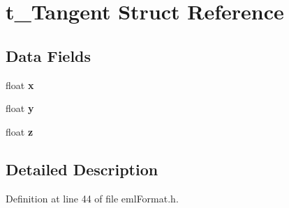 \hypertarget{structt___tangent}{}\section{t\+\_\+\+Tangent Struct Reference}
\label{structt___tangent}
\subsection*{Data Fields}
\begin{DoxyCompactItemize}
\item 
float {\bfseries x}\hypertarget{structt___tangent_a4dc223b5a67817ce9aac4730a16d6cab}{}\label{structt___tangent_a4dc223b5a67817ce9aac4730a16d6cab}

\item 
float {\bfseries y}\hypertarget{structt___tangent_a082edefd5bb11ff1a93c2d879b5cf751}{}\label{structt___tangent_a082edefd5bb11ff1a93c2d879b5cf751}

\item 
float {\bfseries z}\hypertarget{structt___tangent_acd9cb65fb8e4273c0e2df8a125193d78}{}\label{structt___tangent_acd9cb65fb8e4273c0e2df8a125193d78}

\end{DoxyCompactItemize}


\subsection{Detailed Description}


Definition at line 44 of file eml\+Format.\+h.

